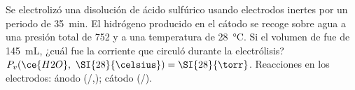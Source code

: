 Se electrolizó una disolución de ácido sulfúrico usando electrodos inertes por un periodo de \SI{35}{\minute}. El hidrógeno producido en el cátodo se recoge sobre agua a una presión total de \SI{752}{\torr} y a una temperatura de \SI{28}{\celsius}. Si el volumen de  fue de \SI{145}{\milli\liter}, ¿cuál fue la corriente que circuló durante la electrólisis? $P_v(\ce{H2O},~\SI{28}{\celsius}) = \SI{28}{\torr}$. Reacciones en los electrodos: ánodo (/,); cátodo (/).
